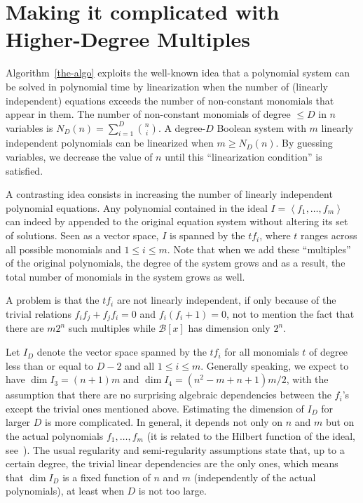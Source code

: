\documentclass[twoside,leqno]{article}
\begin{document}
\section{Making it complicated with Higher-Degree Multiples}
\label{sec:extensions}

Algorithm~\ref{the-algo} exploits the well-known idea that a polynomial system
can be solved in polynomial time by linearization when the number of (linearly
independent) equations exceeds the number of non-constant monomials that appear
in them. The number of non-constant monomials of degree $\leq D$ in $n$
variables is $N_D(n) = \sum_{i=1}^D \binom{n}{i}$. A degree-$D$ Boolean system
with $m$ linearly independent polynomials can be linearized when
$m \geq N_D(n)$. By guessing variables, we decrease the value of $n$ until this
``linearization condition'' is satisfied.

A contrasting idea consists in increasing the number of linearly independent
polynomial equations.  Any polynomial contained in the ideal
$I = \left\langle f_1, \dots, f_m\right\rangle$ can indeed by appended to the
original equation system without altering its set of solutions. Seen as a
vector space, $I$ is spanned by the $t f_i$, where $t$ ranges across all
possible monomials and $1 \leq i \leq m$. Note that when we add these
``multiples'' of the original polynomials, the degree of the system grows and as
a result, the total number of monomials in the system grows as well.


A problem is that the $t f_i$ are not linearly independent, if only because of
the trivial relations $f_i f_j + f_j f_i = 0$ and $f_i (f_i + 1) = 0$, not to
mention the fact that there are $m 2^n$ such multiples while $\mathcal{B}[x]$
has dimension only $2^n$.

Let $I_D$ denote the vector space spanned by the $t f_i$ for all monomials $t$
of degree less than or equal to $D-2$ and all $1 \leq i \leq m$. Generally
speaking, we expect to have $\dim I_3 = (n+1) m$ and
$\dim I_4 = (n^2 - m + n + 1)m/2 $, with the assumption that there are no
surprising algebraic dependencies between the $f_i$'s except the trivial ones
mentioned above. Estimating the dimension of $I_D$ for larger $D$ is more
complicated. In general, it depends not only on $n$ and $m$ but on the actual
polynomials $f_1, \dots, f_m$ (it is related to the Hilbert function of the
ideal, see~\cite{Ideals_varieties_algos}). The usual regularity and
semi-regularity assumptions state that, up to a certain degree, the trivial
linear dependencies are the only ones, which means that $\dim I_D$ is a fixed
function of $n$ and $m$ (independently of the actual polynomials), at least when
$D$ is not too large.
\end{document}
